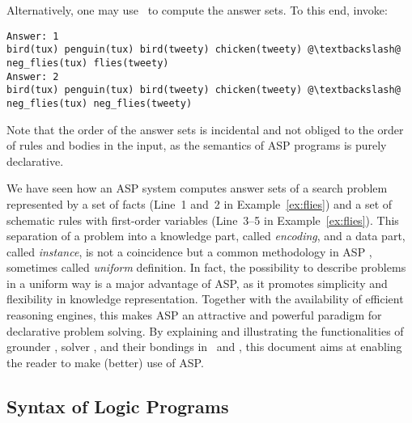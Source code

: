 \begin{example}
{  Alternatively, one may use \clingo\ to compute the answer sets.
  To this end, invoke:\\
  }
%
\begin{lstlisting}[numbers=none,escapechar=@]
Answer: 1
bird(tux) penguin(tux) bird(tweety) chicken(tweety) @\textbackslash@
neg_flies(tux) flies(tweety)
Answer: 2
bird(tux) penguin(tux) bird(tweety) chicken(tweety) @\textbackslash@
neg_flies(tux) neg_flies(tweety)
\end{lstlisting}
%
Note that the order of the answer sets is incidental and 
not obliged to the order of rules and bodies in the input,
as the semantics of ASP programs is purely declarative.
\eexample
\end{example}

We have seen how an ASP system computes answer sets of a search problem
represented by a set of facts (Line~1 and~2 in Example~\ref{ex:flies})
and a set of schematic rules with first-order variables
(Line~3--5 in Example~\ref{ex:flies}).
This separation of a problem into a knowledge part, called \emph{encoding},
and a data part, called \emph{instance}, is not a coincidence
but a common methodology in ASP \cite{martru99a,niemela99a,schlipf95a},
sometimes called \emph{uniform} definition.
In fact, the possibility to describe problems in a uniform way is
a major advantage of ASP, as it promotes simplicity and flexibility in
knowledge representation.
Together with the availability of efficient reasoning engines,
this makes ASP an attractive and powerful paradigm
for declarative problem solving.
By explaining and illustrating the functionalities of
grounder \gringo, solver \clasp, and their bondings in \clingo\ and \iclingo,
this document aims at enabling the reader to make (better) use of ASP.


\subsection{Syntax of Logic Programs}\label{subsec:syntax}

